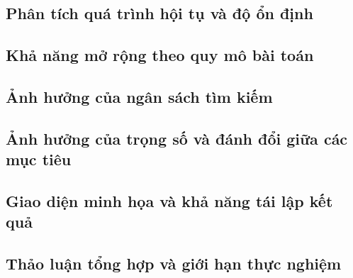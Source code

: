 \subsection{Phân tích quá trình hội tụ và độ ổn định}

\subsection{Khả năng mở rộng theo quy mô bài toán}

\subsection{Ảnh hưởng của ngân sách tìm kiếm}

\subsection{Ảnh hưởng của trọng số và đánh đổi giữa các mục tiêu}

\subsection{Giao diện minh họa và khả năng tái lập kết quả}

\subsection{Thảo luận tổng hợp và giới hạn thực nghiệm}
